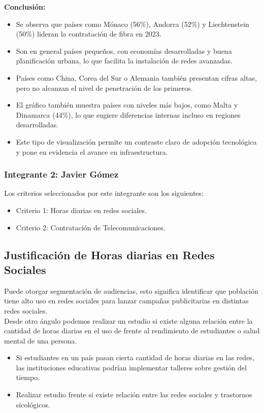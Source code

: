 \documentclass[12pt, a4paper]{article}
\begin{document}
\textbf{Conclusión:}
\begin{itemize}
    \item Se observa que países como Mónaco (56\%), Andorra (52\%) y Liechtenstein (50\%) lideran la contratación de fibra en 2023.
    \item Son en general países pequeños, con economías desarrolladas y buena planificación urbana, lo que facilita la instalación de redes avanzadas.
    \item Países como China, Corea del Sur o Alemania también presentan cifras altas, pero no alcanzan el nivel de penetración de los primeros.
    \item El gráfico también muestra países con niveles más bajos, como Malta y Dinamarca (44\%), lo que sugiere diferencias internas incluso en regiones desarrolladas.
    \item Este tipo de visualización permite un contraste claro de adopción tecnológica y pone en evidencia el avance en infraestructura.
\end{itemize}


\subsubsection*{Integrante 2: Javier Gómez}
Los criterios seleccionados por este integrante son los siguientes:
\begin{itemize}
    \item Criterio 1: Horas diarias en redes sociales.
    \item Criterio 2: Contratación de Telecomunicaciones.
\end{itemize}

\subsection{Justificación de Horas diarias en Redes Sociales}

Puede otorgar segmentación de audiencias, esto significa identificar que población tiene alto uso en redes sociales para lanzar campañas publicitarias en distintas redes sociales. \\
Desde otro ángulo podemos realizar un estudio si existe alguna relación entre la cantidad de horas diarias en el uso de  frente al rendimiento de estudiantes o salud mental de una persona.

\begin{itemize}
    \item Si estudiantes en un país pasan cierta cantidad de horas diarias en las redes, las instituciones educativas podrían implementar talleres sobre gestión del tiempo.
    \item Realizar estudio frente si existe relación entre las redes sociales y trastornos sicológicos.
\end{itemize}
\end{document}
